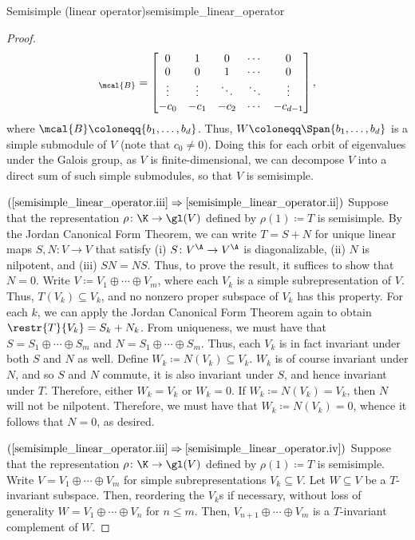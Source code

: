 \begin{thm}{Semisimple (linear operator)}{semisimple_linear_operator}
\begin{proof}
		\begin{equation}
		[T]_{\mcal{B}}=\begin{bmatrix}0 & 1 & 0 & \cdots & 0 \\ 0 & 0 & 1 & \cdots & 0 \\ \vdots & \vdots & \ddots & \ddots & \vdots \\ -c_0 & -c_1 & -c_2 & \cdots & -c_{d-1}\end{bmatrix},
		\end{equation}
		where $\mcal{B}\coloneqq \{ b_1,\ldots ,b_d\}$.  Thus, $W\coloneqq \Span \{ b_1,\ldots ,b_d\}$ is a simple submodule of $V$ (note that $c_0\neq 0$).  Doing this for each orbit of eigenvalues under the Galois group, as $V$ is finite-dimensional, we can decompose $V$ into a direct sum of such simple submodules, so that $V$ is semisimple.
		
		\blankline
		\noindent
		$(\cref{semisimple_linear_operator.iii}\Rightarrow \cref{semisimple_linear_operator.ii})$ Suppose that the representation $\rho \colon \K \rightarrow \gl (V)$ defined by $\rho (1)\coloneq T$ is semisimple.  By the Jordan Canonical Form Theorem, we can write $T=S+N$ for unique linear maps $S,N\colon V\rightarrow V$ that satisfy (i) $S\colon V^{\A}\rightarrow V^{\A}$ is diagonalizable, (ii) $N$ is nilpotent, and (iii) $SN=NS$.  Thus, to prove the result, it suffices to show that $N=0$.  Write $V\coloneqq V_1\oplus \cdots \oplus V_m$, where each $V_k$ is a simple subrepresentation of $V$.  Thus, $T(V_k)\subseteq V_k$, and no nonzero proper subspace of $V_k$ has this property.  For each $k$, we can apply the Jordan Canonical Form Theorem again to obtain $\restr{T}{V_k}=S_k+N_k$.  From uniqueness, we must have that $S=S_1\oplus \cdots \oplus S_m$ and $N=S_1\oplus \cdots \oplus S_m$.  Thus, each $V_k$ is in fact invariant under both $S$ and $N$ as well.  Define $W_k\coloneqq N(V_k)\subseteq V_k$.  $W_k$ is of course invariant under $N$, and so $S$ and $N$ commute, it is also invariant under $S$, and hence invariant under $T$.  Therefore, either $W_k=V_k$ or $W_k=0$.  If $W_k\coloneqq N(V_k)=V_k$, then $N$ will not be nilpotent.  Therefore, we must have that $W_k\coloneqq N(V_k)=0$, whence it follows that $N=0$, as desired.
		
		\blankline
		\noindent
		$(\cref{semisimple_linear_operator.iii}\Rightarrow \cref{semisimple_linear_operator.iv})$ Suppose that the representation $\rho \colon\K \rightarrow \gl (V)$ defined by $\rho (1)\coloneqq T$ is semisimple.  Write $V=V_1\oplus \cdots \oplus V_m$ for simple subrepresentations $V_k\subseteq V$.  Let $W\subseteq V$ be a $T$-invariant subspace.  Then, reordering the $V_k$s if necessary, without loss of generality $W=V_1\oplus \cdots \oplus V_n$ for $n\leq m$.  Then, $V_{n+1}\oplus \cdots \oplus V_m$ is a $T$-invariant complement of $W$.
		

\end{proof}
\end{thm}
